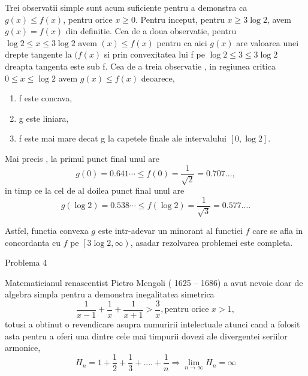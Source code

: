 \documentclass[a4paper,12pt,oneside]{report}
\begin{document}
Trei observatii simple sunt acum suficiente pentru a demonstra ca \(g\left ( x \right )\leq f\left ( x \right )\), pentru orice \(x\geq 0\). Pentru inceput, pentru \(x\geq 3\log 2\), avem \(g\left ( x \right ) = f\left ( x \right )\) din definitie. Cea de a doua observatie, pentru \(\log 2 \leq  x \leq  3\log 2\) avem  \(( x )\leq f\left ( x \right ) \) pentru ca aici  \(g\left ( x \right )\) are valoarea unei drepte tangente la \((f\left ( x \right )\) si prin convexitatea lui f pe \(\log 2 \leq  3 \leq 3\log 2\) dreapta tangenta este sub f. Cea de a treia observatie , in regiunea critica \(0\leq  x \leq \log2\) avem \(g\left ( x \right ) \leq  f\left ( x \right )\) deoarece,  
\begin{enumerate}
  \item f este concava,
  \item g este liniara, 
  \item f este mai mare decat g la capetele finale ale intervalului \(\left [ 0 , \log 2 \right ]\).
\end{enumerate}
Mai precis , la primul punct final unul are 
\begin{displaymath}
  g\left ( 0 \right ) = 0.641\cdots \leq f\left ( 0 \right ) = \frac{1}{\sqrt{2}} = 0.707...,
\end{displaymath}
in timp ce la cel de al doilea punct final unul are  
\begin{displaymath}
  g\left ( \log 2 \right ) = 0.538\cdots  \leq f\left ( \log2 \right ) = \frac{1}{\sqrt{3}} = 0.577... .
\end{displaymath}

Astfel, functia convexa \(g\) este intr-adevar un minorant al functiei \(f\) care se afla in concordanta cu \(f\) pe \(\left [ 3\log 2 , \infty  \right )\), asadar rezolvarea problemei este completa. 

Problema 4

   Matematicianul renascentist Pietro Mengoli ( 1625 – 1686) a avut nevoie doar de algebra simpla pentru a demonstra inegalitatea simetrica 
 \begin{displaymath}
   \frac{1}{x - 1} + \frac{1}{x} + \frac{1}{x + 1} > \frac{3}{x} , \text{pentru orice } x > 1, \label{eq:2.11} \tag{2.11}
 \end{displaymath}
totusi a obtinut o revendicare asupra numuririi intelectuale atunci cand a folosit asta pentru a oferi una dintre cele mai timpurii dovezi ale divergentei seriilor armonice, 
\begin{displaymath}
  H_{n} = 1 + \frac{1}{2} + \frac{1}{3} + ....+ \frac{1}{n} \Rightarrow \lim_{n \to \infty } H_{n} = \infty \label{eq:2.12} \tag{2.12}
\end{displaymath}
\end{document}
